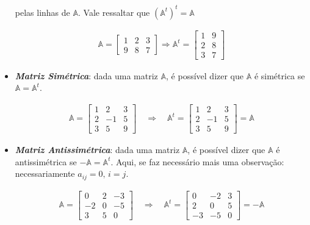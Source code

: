 \begin{itemize}
	pelas linhas de $\mathbb{A}$. Vale ressaltar que $({\mathbb{A}^t})^t = \mathbb{A}$
	\begin{ceqn}
		\begin{align*}
		\mathbb{A}=\begin{bmatrix}1 & 2 & 3\\
		9 & 8 & 7
		\end{bmatrix}\Rightarrow\mathbb{A}^{t}=\begin{bmatrix}1 & 9\\
		2 & 8\\
		3 & 7
		\end{bmatrix}
		\end{align*}
	\end{ceqn}
	\item \textit{\textbf{Matriz Simétrica}}: dada uma matriz $\mathbb{A}$, é possível dizer que $\mathbb{A}$ é simétrica se $\mathbb{A}=\mathbb{A}^t$.
	\begin{ceqn}
		\begin{align*}
		\mathbb{A}=\begin{bmatrix}1 & 2 & 3\\
		2 & -1 & 5\\
		3 & 5 & 9
		\end{bmatrix}\quad\Rightarrow\quad\mathbb{A}^{t}=\begin{bmatrix}1 & 2 & 3\\
		2 & -1 & 5\\
		3 & 5 & 9
		\end{bmatrix}=\mathbb{A}
		\end{align*}
	\end{ceqn}
	\item \textit{\textbf{Matriz Antissimétrica}}: dada uma matriz $\mathbb{A}$, é possível dizer que $\mathbb{A}$ é antissimétrica se $-\mathbb{A}=\mathbb{A}^t$. Aqui, se faz necessário mais uma observação: necessariamente $a_{ij}=0, \,i=j$.
	\begin{ceqn}
		\begin{align*}
		\mathbb{A}=\begin{bmatrix}0 & 2 & -3\\
		-2 & 0 & -5\\
		3 & 5 & 0
		\end{bmatrix}\quad\Rightarrow\quad\mathbb{A}^{t}=\begin{bmatrix}0 & -2 & 3\\
		2 & 0 & 5\\
		-3 & -5 & 0
		\end{bmatrix}=-\mathbb{A}
		\end{align*}

\end{ceqn}
\end{itemize}
